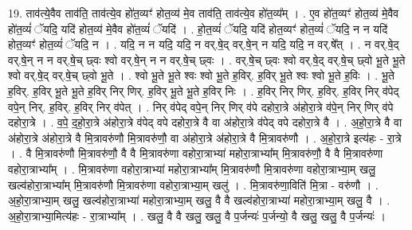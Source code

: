 \documentclass[17pt]{extarticle}
\begin{document}
19. ताव॑त्ये॒वैव ताव॑ति॒ ताव॑त्ये॒व हो॑त॒व्यꣳ॑ होत॒व्य॑ मे॒व ताव॑ति॒ ताव॑त्ये॒व हो॑त॒व्य᳚म् । . ए॒व हो॑त॒व्यꣳ॑ होत॒व्य॑ मे॒वैव हो॑त॒व्यं॑ ॅयदि॒ यदि॑ होत॒व्य॑ मे॒वैव हो॑त॒व्यं॑ ॅयदि॑ । . हो॒त॒व्यं॑ ॅयदि॒ यदि॑ होत॒व्यꣳ॑ होत॒व्यं॑ ॅयदि॒ न न यदि॑ होत॒व्यꣳ॑ होत॒व्यं॑ ॅयदि॒ न । . यदि॒ न न यदि॒ यदि॒ न वर्.षे॒द् वर्.षे॒न् न यदि॒ यदि॒ न वर्.षे᳚त् । . न वर्.षे॒द् वर्.षे॒न् न न वर्.षे॒च् छ्वः श्वो वर्.षे॒न् न न वर्.षे॒च् छ्वः । . वर्.षे॒च् छ्वः श्वो वर्.षे॒द् वर्.षे॒च् छ्वो भू॒ते भू॒ते श्वो वर्.षे॒द् वर्.षे॒च् छ्वो भू॒ते । . श्वो भू॒ते भू॒ते श्वः श्वो भू॒ते ह॒विर्. ह॒विर् भू॒ते श्वः श्वो भू॒ते ह॒विः । . भू॒ते ह॒विर्. ह॒विर् भू॒ते भू॒ते ह॒विर् निर् णिर्. ह॒विर् भू॒ते भू॒ते ह॒विर् निः । . ह॒विर् निर् णिर्. ह॒विर्. ह॒विर् निर् व॑पेद् वपे॒न् निर्. ह॒विर्. ह॒विर् निर् व॑पेत् । . निर् व॑पेद् वपे॒न् निर् णिर् व॑पे दहोरा॒त्रे अ॑होरा॒त्रे व॑पे॒न् निर् णिर् व॑पे दहोरा॒त्रे । . व॒पे॒ द॒हो॒रा॒त्रे अ॑होरा॒त्रे व॑पेद् वपे दहोरा॒त्रे वै वा अ॑होरा॒त्रे व॑पेद् वपे दहोरा॒त्रे वै । . अ॒हो॒रा॒त्रे वै वा अ॑होरा॒त्रे अ॑होरा॒त्रे वै मि॒त्रावरु॑णौ मि॒त्रावरु॑णौ॒ वा अ॑होरा॒त्रे अ॑होरा॒त्रे वै मि॒त्रावरु॑णौ । . अ॒हो॒रा॒त्रे इत्य॑हः - रा॒त्रे । . वै मि॒त्रावरु॑णौ मि॒त्रावरु॑णौ॒ वै वै मि॒त्रावरु॑णा वहोरा॒त्राभ्या॑ महोरा॒त्राभ्या᳚म् मि॒त्रावरु॑णौ॒ वै वै मि॒त्रावरु॑णा वहोरा॒त्राभ्या᳚म् । . मि॒त्रावरु॑णा वहोरा॒त्राभ्या॑ महोरा॒त्राभ्या᳚म् मि॒त्रावरु॑णौ मि॒त्रावरु॑णा वहोरा॒त्राभ्या॒म् खलु॒ खल्व॑होरा॒त्राभ्या᳚म् मि॒त्रावरु॑णौ मि॒त्रावरु॑णा वहोरा॒त्राभ्या॒म् खलु॑ । . मि॒त्रावरु॑णा॒विति॑ मि॒त्रा - वरु॑णौ । . अ॒हो॒रा॒त्राभ्या॒म् खलु॒ खल्व॑होरा॒त्राभ्या॑ महोरा॒त्राभ्या॒म् खलु॒ वै वै खल्व॑होरा॒त्राभ्या॑ महोरा॒त्राभ्या॒म् खलु॒ वै । . अ॒हो॒रा॒त्राभ्या॒मित्य॑हः - रा॒त्राभ्या᳚म् । . खलु॒ वै वै खलु॒ खलु॒ वै प॒र्जन्यः॑ प॒र्जन्यो॒ वै खलु॒ खलु॒ वै प॒र्जन्यः॑ । \newline
\end{document}
